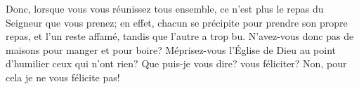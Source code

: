 Donc, lorsque vous vous réunissez tous ensemble,
	ce n’est plus le repas du Seigneur que vous prenez;
	en effet, chacun se précipite pour prendre son propre repas,
	et l’un reste affamé, tandis que l’autre a trop bu.
N’avez-vous donc pas de maisons pour manger et pour boire?
Méprisez-vous l’Église de Dieu au point d’humilier ceux qui n’ont rien?
Que puis-je vous dire? vous féliciter?
Non, pour cela je ne vous félicite pas!
